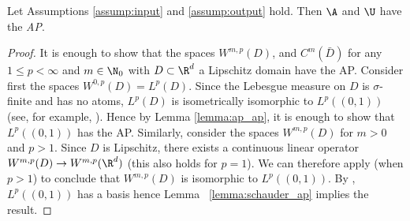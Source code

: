 \begin{lemma}
\label{lemma:ap}
Let Assumptions \ref{assump:input} and \ref{assump:output} hold. Then \(\A\) and \(\U\) have the \emph{AP}.
\end{lemma}

\begin{proof}
It is enough to show that the spaces \(W^{m,p}(D)\), and \(C^m (\bar{D})\) for 
any \(1 \leq p < \infty\) and \(m \in \N_0\) with \(D \subset \R^d\) a Lipschitz domain have the AP.
Consider first the spaces \(W^{0,p} (D) = L^p(D)\). Since the Lebesgue measure on \(D\) is 
\(\sigma\)-finite and has no atoms, \(L^p(D)\) is isometrically isomorphic 
to \(L^p ((0,1))\) (see, for example, \cite[Chapter 6]{albiac2006topics}). Hence by
Lemma \ref{lemma:ap_ap}, it is enough to show that \(L^p((0,1))\) has the AP. Similarly, consider the spaces \(W^{m,p}(D)\) for \(m > 0\) and \(p > 1\). 
Since \(D\) is Lipschitz, 
there exists a continuous linear operator \(W^{m,p} (D) \to W^{m,p} (\R^d)\) \cite[Chapter 6, Theorem 5]{stein1970singular}
(this also holds for \(p=1\)). We can therefore apply \cite[Corollary 4]{pelczynski2001contribution} (when \(p > 1\))
to conclude that \(W^{m,p}(D)\) is isomorphic to \(L^p((0,1))\). By \cite[Proposition 6.1.3]{albiac2006topics},
\(L^p((0,1))\) has a basis hence Lemma~ \ref{lemma:schauder_ap} implies the result.


\end{proof}
